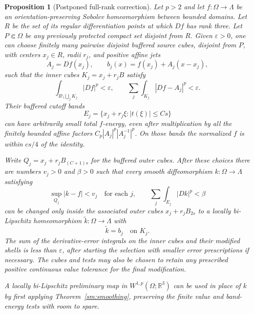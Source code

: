 \documentclass[11pt]{article}
\numberwithin{equation}{section}
\newtheorem{proposition}[theorem]{Proposition}
\theoremstyle{definition}
\theoremstyle{remark}
\begin{document}
\begin{proposition}[Postponed full-rank correction]
\label{hp:full-rank-correction}
Let $p>2$ and let $f:\Omega\to\Lambda$ be an orientation-preserving
Sobolev homeomorphism between bounded domains.  Let $R$ be the set
of its regular differentiation points at which $Df$ has rank three.
Let $P\Subset\Omega$ be any previously protected compact set
disjoint from $R$.  Given $\varepsilon>0$, one can choose finitely
many pairwise disjoint buffered source cubes, disjoint from $P$,
with centers $x_j\in R$, radii $r_j$, and positive affine jets
\[
 A_j=Df(x_j),\qquad
 b_j(x)=f(x_j)+A_j(x-x_j),
\]
such that the inner cubes $K_j=x_j+r_jB$ satisfy
\begin{equation}\label{hp:full-rank-core-tests}
 \int_{R\setminus\bigcup_jK_j}|Df|^p<\varepsilon,
 \qquad
 \sum_j\int_{K_j}|Df-A_j|^p<\varepsilon.
\end{equation}
Their buffered cutoff bands
\[
 E_j=\{x_j+r_j\xi:|t(\xi)|\leq Cs\}
\]
can have arbitrarily small total $f$-energy, even after multiplication
by all the finitely bounded affine factors
$C_p|A_j|^p|A_j^{-1}|^p$.  On those bands the normalized $f$ is
within $cs/4$ of the identity.

Write $Q_j=x_j+r_jB_{(C+1)s}$ for the buffered outer cubes.
After these choices there are numbers $v_j>0$ and $\beta>0$ such
that every smooth diffeomorphism $k:\Omega\to\Lambda$ satisfying
\[
 \sup_{Q_j}|k-f|<v_j\quad\text{for each }j,
 \qquad \sum_j\int_{E_j}|Dk|^p<\beta
\]
can be changed only inside the associated outer cubes
$x_j+r_jB_{2s}$ to a locally bi-Lipschitz homeomorphism
$\widetilde k:\Omega\to\Lambda$ with
\[
 \widetilde k=b_j\quad\text{on }K_j.
\]
The sum of the derivative-error integrals on the inner cubes and
their modified shells is less than $\varepsilon$, after starting the
selection with smaller error prescriptions if necessary.  The cubes
and tests may also be chosen to retain any prescribed positive
continuous value tolerance for the final modification.

A locally bi-Lipschitz preliminary map in $W^{1,p}(\Omega;\mathbb R^3)$
can be used in place of $k$ by first applying Theorem~\ref{sm:smoothing}, preserving the finite
value and band-energy tests with room to spare.
\end{proposition}
\end{document}
